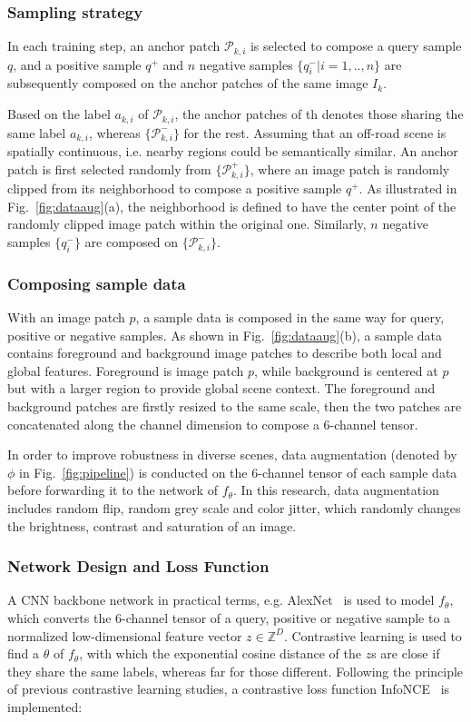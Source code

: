 \documentclass[letterpaper, 10 pt, conference]{ieeeconf}  %
\begin{document}
\subsubsection {Sampling strategy}

In each training step, an anchor patch $\mathcal{P}_{k,i}$ is selected to compose a query sample $q$, and a positive sample $q^+$ and $n$ negative samples $\{q^-_i|i=1,..,n\}$ are subsequently composed on the anchor patches of the same image $I_k$.

Based on the label $a_{k,i}$ of $\mathcal{P}_{k,i}$, the anchor patches of th denotes those sharing the same label $a_{k,i}$, whereas $\{\mathcal{P}_{k,i}^-\}$ for the rest.
Assuming that an off-road scene is spatially continuous, i.e. nearby regions could be semantically similar.
An anchor patch is first selected randomly from $\{\mathcal{P}_{k,i}^+\}$, where an image patch is randomly clipped from its neighborhood to compose a positive sample $q^+$. As illustrated in Fig.~\ref{fig:dataaug}(a), the neighborhood is defined to have the center point of the randomly clipped image patch within the original one. Similarly, $n$ negative samples $\{q^-_i\}$ are composed on $\{\mathcal{P}_{k,i}^-\}$.

\subsubsection{Composing sample data}

With an image patch $p$, a sample data is composed in the same way for query, positive or negative samples.
As shown in Fig.~\ref{fig:dataaug}(b), a sample data contains foreground and background image patches to describe both local and global features. Foreground is image patch $p$, while background is centered at $p$ but with a larger region to provide global scene context. The foreground and background patches are firstly resized to the same scale, then the two patches are concatenated along the channel dimension to compose a 6-channel tensor.

In order to improve robustness in diverse scenes, data augmentation (denoted by $\phi$ in Fig.~\ref{fig:pipeline}) is conducted on the 6-channel tensor of each sample data before forwarding it to the network of $f_{\theta}$. In this research, data augmentation includes random flip, random grey scale and color jitter, which randomly changes the brightness, contrast and saturation of an image.

\subsubsection{Network Design and Loss Function}
A CNN backbone network in practical terms, e.g. AlexNet~\cite{krizhevsky2012imagenet} is used to model $f_{\theta}$, which converts the 6-channel tensor of a query, positive or negative sample to a normalized low-dimensional feature vector $z\in \mathbb{Z}^D$.
Contrastive learning is used to find a $\theta$ of $f_{\theta}$, with which the exponential cosine distance of the $z$s are close if they share the same labels, whereas far for those different.
Following the principle of previous contrastive learning studies, a contrastive loss function InfoNCE~\cite{oord2018representation} is implemented:
\end{document}
